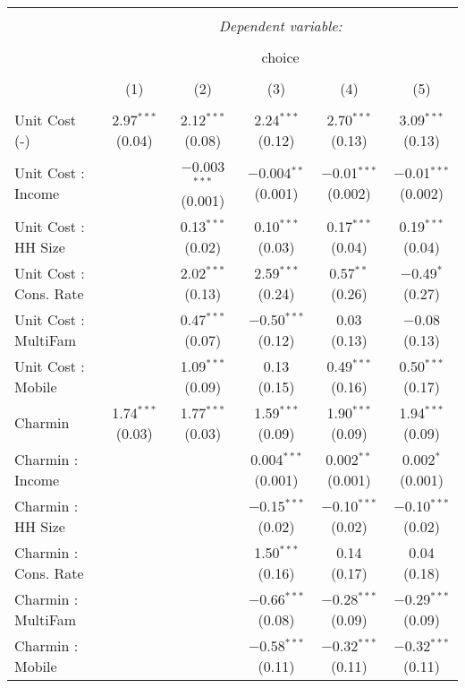 
\begin{table}[!htbp] \centering 
  \caption{} 
  \label{tab:mnlPhoenixObsHet} 
\begin{tabular}{@{\extracolsep{5pt}}lccccc} 
\\[-1.8ex]\hline 
\hline \\[-1.8ex] 
 & \multicolumn{5}{c}{\textit{Dependent variable:}} \\ 
\cline{2-6} 
\\[-1.8ex] & \multicolumn{5}{c}{choice} \\ 
\\[-1.8ex] & (1) & (2) & (3) & (4) & (5)\\ 
\hline \\[-1.8ex] 
 Unit Cost (-) & 2.97$^{***}$ (0.04) & 2.12$^{***}$ (0.08) & 2.24$^{***}$ (0.12) & 2.70$^{***}$ (0.13) & 3.09$^{***}$ (0.13) \\ 
  Unit Cost : Income &  & $-$0.003$^{***}$ (0.001) & $-$0.004$^{**}$ (0.001) & $-$0.01$^{***}$ (0.002) & $-$0.01$^{***}$ (0.002) \\ 
  Unit Cost : HH Size &  & 0.13$^{***}$ (0.02) & 0.10$^{***}$ (0.03) & 0.17$^{***}$ (0.04) & 0.19$^{***}$ (0.04) \\ 
  Unit Cost : Cons. Rate &  & 2.02$^{***}$ (0.13) & 2.59$^{***}$ (0.24) & 0.57$^{**}$ (0.26) & $-$0.49$^{*}$ (0.27) \\ 
  Unit Cost : MultiFam &  & 0.47$^{***}$ (0.07) & $-$0.50$^{***}$ (0.12) & 0.03 (0.13) & $-$0.08 (0.13) \\ 
  Unit Cost : Mobile &  & 1.09$^{***}$ (0.09) & 0.13 (0.15) & 0.49$^{***}$ (0.16) & 0.50$^{***}$ (0.17) \\ 
  Charmin & 1.74$^{***}$ (0.03) & 1.77$^{***}$ (0.03) & 1.59$^{***}$ (0.09) & 1.90$^{***}$ (0.09) & 1.94$^{***}$ (0.09) \\ 
  Charmin : Income &  &  & 0.004$^{***}$ (0.001) & 0.002$^{**}$ (0.001) & 0.002$^{*}$ (0.001) \\ 
  Charmin : HH Size &  &  & $-$0.15$^{***}$ (0.02) & $-$0.10$^{***}$ (0.02) & $-$0.10$^{***}$ (0.02) \\ 
  Charmin : Cons. Rate &  &  & 1.50$^{***}$ (0.16) & 0.14 (0.17) & 0.04 (0.18) \\ 
  Charmin : MultiFam &  &  & $-$0.66$^{***}$ (0.08) & $-$0.28$^{***}$ (0.09) & $-$0.29$^{***}$ (0.09) \\ 
  Charmin : Mobile &  &  & $-$0.58$^{***}$ (0.11) & $-$0.32$^{***}$ (0.11) & $-$0.32$^{***}$ (0.11) \\ 

\end{tabular}
\end{table}
